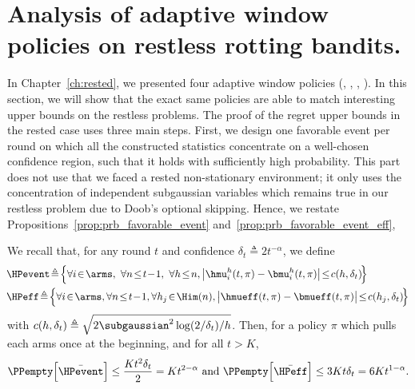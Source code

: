 \section{Analysis of adaptive window policies on restless rotting bandits.} 
\label{sec:restless-theory}
In Chapter~\ref{ch:rested}, we presented four adaptive window policies (\FEWA, \RAWUCB, \EFFFEWA, \EFFRAW). In this section, we will show that the exact same policies are able to match interesting upper bounds on the restless problems.  The proof of the regret upper bounds in the rested case uses three main steps. First, we design one favorable event per round on which all the constructed statistics concentrate on a well-chosen confidence region, such that it holds with sufficiently high probability. This part does not use that we faced a rested non-stationary environment; it only uses the concentration of independent subgaussian variables which remains true in our restless problem due to Doob's optional skipping. Hence, we restate Propositions~\ref{prop:prb_favorable_event} and~\ref{prop:prb_favorable_event_eff},
\begin{proposition}
\label{prop:prb_favorable_event_full}
We recall that, for any round $t$ and confidence $\delta_{t} \triangleq 2t^{-\alpha}$, we define
%
\begin{align*}
&\!\HPevent\! \triangleq\! \Big\{ \forall i\!\in\!\arms,\ \forall n \!\leq\! t\!-\!1 ,\ \forall h \!\leq\! n, \big| \hmu^h_i(t, \pi) - \bmu^h_i(t, \pi) \big| \!\leq\! c(h, \delta_{t}) \!\Big\}\\
&\!\HPeff\! \triangleq\! \Big\{ \forall i\!\in\!\arms, \forall n \!\leq\! t\!-\!1 , \forall h_j \!\in\! \Him(n), \big| \hmueff(t,\pi) - \bmueff(t,\pi) \big| \!\leq\! c(h_j, \delta_{t}) \!\Big\}
\end{align*}
with  $c(h,\delta_{t}) \triangleq \sqrt{2 \subgaussian^2\log(2/\delta_t)/h}$. Then, for a policy $\pi$ which pulls each arms once at the beginning, and for all $t>K$,
\[
\PPempty\Big[\bar{\HPevent}\Big] \leq \frac{Kt^2\delta_{t}}{2}=Kt^{2-\alpha} \text{ and } \PPempty\Big[\bar{\HPeff}\Big] \leq 3Kt\delta_t= 6Kt^{1-\alpha}.
\]
\end{proposition} 

